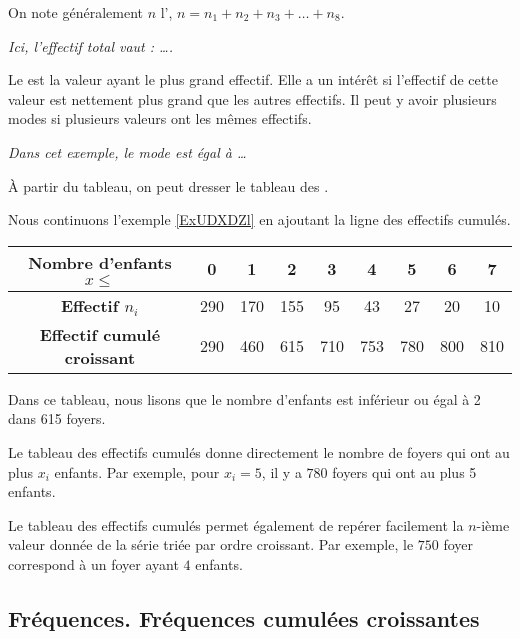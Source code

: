 On note généralement $n$ l', $n=n_1+n_2+n_3+{\ldots}+n_8$. 

\textit{Ici, l'effectif total vaut :  \ldots. }

Le  est la valeur ayant le plus grand effectif. Elle a un intérêt si l'effectif de cette valeur est nettement plus grand que les autres effectifs. Il peut y avoir plusieurs modes si plusieurs valeurs ont les mêmes effectifs.

\textit{Dans cet exemple, le mode est égal à \ldots}

À partir du tableau, on peut dresser le tableau des .

\begin{example} \label{ExZdeBXW}
    Nous continuons l'exemple \ref{ExUDXDZl} en ajoutant la ligne des effectifs cumulés.
\begin{center}
\begin{tabular}[h]{|c|c|c|c|c|c|c|c|c|}
    \hline
  \textbf{Nombre d'enfants $x\leq$} & 0 & 1 & 2 & 3 & 4 & 5 & 6 & 7 \\
  \hline
  \textbf{Effectif $n_i$} & 290 & 170 & 155 & 95 & 43 & 27 & 20 & 10 \\
  \hline
  \textbf{Effectif cumulé croissant} & 290 & 460 & 615 & 710 & 753 & 780 & 800 & 810 \\ 
  \hline
\end{tabular}
    
\end{center}

Dans ce tableau, nous lisons  que le nombre d'enfants est inférieur ou égal à 2 dans 615 foyers.
    
\end{example}



\begin{remark}
Le tableau des effectifs cumulés donne directement le nombre de foyers qui ont au plus $x_i$ enfants.  Par exemple, pour $x_i=5$, il y a \( 780\) foyers qui ont au plus 5 enfants.
\end{remark}


\begin{remark}
Le tableau des effectifs cumulés permet également de repérer facilement la $n$-ième valeur donnée de la série triée par ordre croissant.  Par exemple, le $750$\ieme{} foyer correspond à un foyer ayant \( 4\) enfants. 
\end{remark}


\subsection{Fréquences. Fréquences cumulées croissantes}

